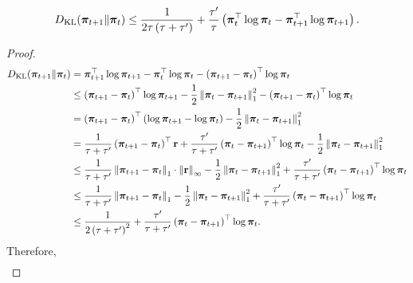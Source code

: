 \begin{lem}
\label{lem:kl_tp1_t_bound}
\begin{equation*}
\begin{split}
    D_{\mathrm{KL}}{\left( {\boldsymbol{\pi}}_{t+1} \middle\| {\boldsymbol{\pi}}_t \right)} \le \frac{1}{2\tau \left(\tau + \tau^\prime\right)} + \frac{\tau^\prime}{\tau} \left( {\boldsymbol{\pi}}_t^\top \log{{\boldsymbol{\pi}}_t} -  {\boldsymbol{\pi}}_{t+1}^\top \log{{\boldsymbol{\pi}}_{t+1}}  \right).
\end{split}
\end{equation*}
\end{lem}
\begin{proof}
\begin{equation*}
\begin{split}
    D_{\mathrm{KL}}{\left( {\boldsymbol{\pi}}_{t+1} \middle\| {\boldsymbol{\pi}}_t \right)} &= {\boldsymbol{\pi}}_{t+1}^\top \log{{\boldsymbol{\pi}}_{t+1}} - {\boldsymbol{\pi}}_t^\top \log{{\boldsymbol{\pi}}_t} - \left( {\boldsymbol{\pi}}_{t+1} - {\boldsymbol{\pi}}_t  \right)^\top \log{{\boldsymbol{\pi}}_t} \\
    &\le \left( {\boldsymbol{\pi}}_{t+1} - {\boldsymbol{\pi}}_t  \right)^\top \log{{\boldsymbol{\pi}}_{t+1}} - \frac{1}{2} \left\| {\boldsymbol{\pi}}_t - {\boldsymbol{\pi}}_{t+1} \right\|_1^2 - \left( {\boldsymbol{\pi}}_{t+1} - {\boldsymbol{\pi}}_t  \right)^\top \log{{\boldsymbol{\pi}}_t} \\
    &= \left( {\boldsymbol{\pi}}_{t+1} - {\boldsymbol{\pi}}_t  \right)^\top \left( \log{{\boldsymbol{\pi}}_{t+1}} - \log{{\boldsymbol{\pi}}_t} \right) - \frac{1}{2} \left\| {\boldsymbol{\pi}}_t - {\boldsymbol{\pi}}_{t+1} \right\|_1^2 \\
    &= \frac{1}{\tau + \tau^\prime} \left( {\boldsymbol{\pi}}_{t+1} - {\boldsymbol{\pi}}_t \right)^\top {\mathbf{r}} + \frac{\tau^\prime}{\tau + \tau^\prime} \left( {\boldsymbol{\pi}}_t - {\boldsymbol{\pi}}_{t+1} \right)^\top \log{{\boldsymbol{\pi}}_t} - \frac{1}{2} \left\| {\boldsymbol{\pi}}_t - {\boldsymbol{\pi}}_{t+1} \right\|_1^2 \\
    &\le \frac{1}{\tau + \tau^\prime} \left\| {\boldsymbol{\pi}}_{t+1} - {\boldsymbol{\pi}}_t \right\|_1 \cdot \left\| {\mathbf{r}} \right\|_\infty - \frac{1}{2} \left\| {\boldsymbol{\pi}}_t - {\boldsymbol{\pi}}_{t+1} \right\|_1^2 + \frac{\tau^\prime}{\tau + \tau^\prime} \left( {\boldsymbol{\pi}}_t - {\boldsymbol{\pi}}_{t+1} \right)^\top \log{{\boldsymbol{\pi}}_t} \\
    &\le \frac{1}{\tau + \tau^\prime} \left\| {\boldsymbol{\pi}}_{t+1} - {\boldsymbol{\pi}}_t \right\|_1  - \frac{1}{2} \left\| {\boldsymbol{\pi}}_t - {\boldsymbol{\pi}}_{t+1} \right\|_1^2 + \frac{\tau^\prime}{\tau + \tau^\prime} \left( {\boldsymbol{\pi}}_t - {\boldsymbol{\pi}}_{t+1} \right)^\top \log{{\boldsymbol{\pi}}_t} \\
    &\le \frac{1}{2\left(\tau + \tau^\prime\right)^2} + \frac{\tau^\prime}{\tau + \tau^\prime} \left( {\boldsymbol{\pi}}_t - {\boldsymbol{\pi}}_{t+1} \right)^\top \log{{\boldsymbol{\pi}}_t}.
\end{split}
\end{equation*}
Therefore,
\begin{equation*}
\begin{split}

\end{split}
\end{equation*}
\end{proof}
